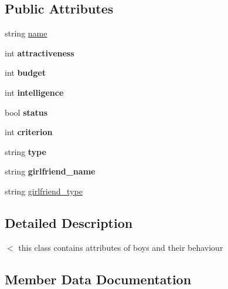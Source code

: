 \subsection*{Public Attributes}
\begin{DoxyCompactItemize}
\item 
string \hyperlink{class_boy_a8649f275f6428267fad0234866c1ccfa}{name}
\item 
int {\bfseries attractiveness}\hypertarget{class_boy_a679e59279116986aaae135d8a524bc46}{}\label{class_boy_a679e59279116986aaae135d8a524bc46}

\item 
int {\bfseries budget}\hypertarget{class_boy_a3b755250e77f892967872c7eb4c26685}{}\label{class_boy_a3b755250e77f892967872c7eb4c26685}

\item 
int {\bfseries intelligence}\hypertarget{class_boy_a10f24ab1e3dbee6fac2a122c76954fa5}{}\label{class_boy_a10f24ab1e3dbee6fac2a122c76954fa5}

\item 
bool {\bfseries status}\hypertarget{class_boy_ad821b3784db5bb5e0fd7901a65862a32}{}\label{class_boy_ad821b3784db5bb5e0fd7901a65862a32}

\item 
int {\bfseries criterion}\hypertarget{class_boy_af1d9f7f10ec4d4d5ad0f194543ec5a53}{}\label{class_boy_af1d9f7f10ec4d4d5ad0f194543ec5a53}

\item 
string {\bfseries type}\hypertarget{class_boy_ab4013ade7aae6f5fa038d568e1f4015f}{}\label{class_boy_ab4013ade7aae6f5fa038d568e1f4015f}

\item 
string {\bfseries girlfriend\+\_\+name}\hypertarget{class_boy_a35eeea6a44c63b9f64387253f5887340}{}\label{class_boy_a35eeea6a44c63b9f64387253f5887340}

\item 
string \hyperlink{class_boy_a14bcd028dc32bc027173fc6b59f9b0ef}{girlfriend\+\_\+type}
\end{DoxyCompactItemize}


\subsection{Detailed Description}
$<$ this class contains attributes of boys and their behaviour 

\subsection{Member Data Documentation}
